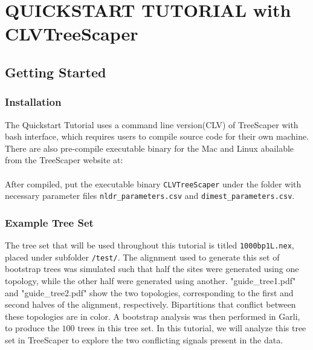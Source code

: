 \documentclass[11pt]{article}
\begin{document}
\newpage
\section{QUICKSTART TUTORIAL with CLVTreeScaper}\label{sect:QuickstartTutorial}

\subsection{Getting Started}\label{subsect:GettingStarted}

\subsubsection{Installation}\label{subsubsect:Installation}

The Quickstart Tutorial uses a command line version(CLV) of TreeScaper with bash interface, which requires users to compile source code for their own machine. There are also pre-compile executable binary for the Mac and Linux abailable from the TreeScaper website at: \\

 \\

After compiled, put the executable binary {\tt CLVTreeScaper} under the folder with necessary parameter files {\tt nldr\_parameters.csv} and {\tt dimest\_parameters.csv}.\\
\subsubsection{Example Tree Set}\label{subsubsect:ExampleTreeSet}

The tree set that will be used throughout this tutorial is titled {\tt 1000bp1L.nex}, placed under subfolder {\tt /test/}. The alignment used to generate this set of bootstrap trees was simulated such that half the sites were generated using one topology, while the other half were generated using another. "guide\_tree1.pdf" and "guide\_tree2.pdf" show the two topologies, corresponding to the first and second halves of the alignment, respectively.  Bipartitions that conflict between these topologies are in color.  A bootstrap analysis was then performed in Garli, to produce the $100$ trees in this tree set.  In this tutorial, we will analyze this tree set in TreeScaper to explore the two conflicting signals present in the data. \\
\end{document}
